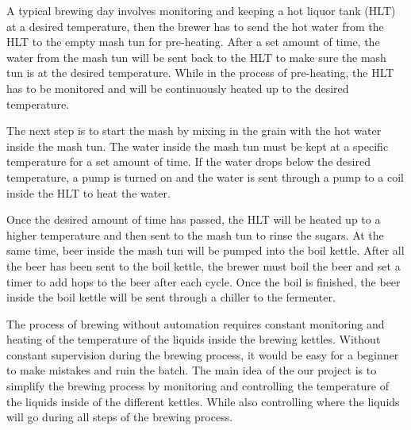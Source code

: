 A typical brewing day involves monitoring and keeping a hot liquor tank (HLT) at a desired temperature, then the
brewer has to send the hot water from the HLT to the empty mash tun for pre-heating. After a set amount of time, the water from the mash tun
will be sent back to the HLT to make sure the mash tun is at the desired temperature. While in the process of
pre-heating, the HLT has to be monitored and will be continuously heated up to the desired temperature.

The next step is to start the mash by mixing in the grain with the hot water inside the mash tun. The water inside the mash tun must be kept at a specific temperature for a set amount of time. If the water drops below the desired temperature, a pump is turned on and the water
is sent through a pump to a coil inside the HLT to heat the water.

Once the desired amount of time has passed, the HLT will
be heated up to a higher temperature and then sent to the mash tun to rinse the sugars.
At the same time, beer inside the mash tun will be pumped into the boil kettle.
After all the beer has been sent to the boil kettle, the brewer must boil the beer and set a timer to add hops to the beer
after each cycle. Once the boil is finished, the beer inside the boil kettle will be sent through a chiller to the fermenter.

The process of brewing without automation requires constant monitoring and heating of the temperature of the liquids inside the brewing kettles. Without constant supervision during the brewing process, it would be easy for a beginner to make mistakes and ruin the batch. The main idea of the our project is to simplify the brewing process by monitoring and controlling the temperature of the liquids inside of the different kettles. While also controlling where the liquids will go during all steps of the brewing process.
